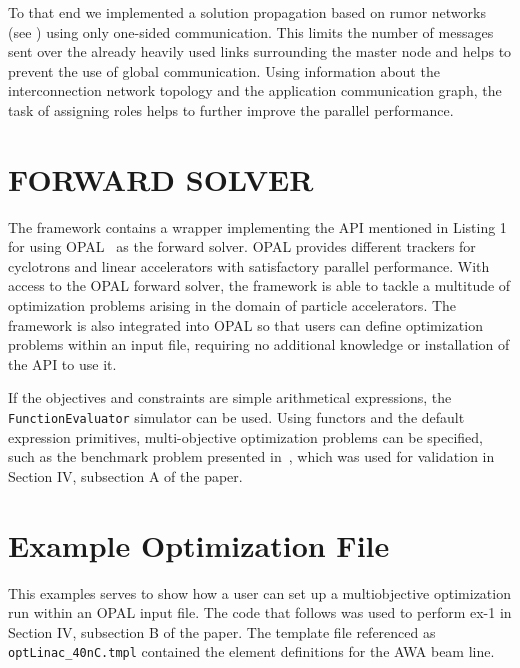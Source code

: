\documentclass[preprint,linenumbers,amsmath,amssymb,aps,prstab]{revtex4-1}%
\begin{document}
To that end we implemented a solution propagation based on rumor networks 
(see \cite{bgps:06,ayss:09}) using only one-sided communication.
This limits the number of messages sent over the already heavily used links
surrounding the master node and helps to prevent the use of
global communication. Using information about the interconnection network topology and the
application communication graph, the task of assigning roles helps to further
improve the parallel performance.



\section{FORWARD SOLVER} \label{sec:forward-solver}

The framework contains a wrapper implementing the API mentioned in
  Listing 1 for using \textsc{OPAL}~\cite{opal} as the forward solver.
\textsc{OPAL} provides different trackers for cyclotrons and linear
  accelerators with satisfactory parallel performance. 
With access to the \textsc{OPAL} forward solver, the framework is able to
  tackle a multitude of optimization problems arising in the domain of
  particle accelerators.
  The framework is also integrated into \textsc{OPAL} so that users can 
  define optimization problems within an input file, requiring no 
  additional knowledge or installation of the API to use it.

If the objectives and constraints are simple arithmetical expressions, 
the \texttt{FunctionEvaluator} simulator can be used.
Using functors and the default expression primitives, 
multi-objective optimization problems can be specified, 
such as the benchmark problem presented in~\cite{hbwh:05}, 
which was used for validation in Section IV, subsection A of the paper.



\section{Example Optimization File}

This examples serves to show how a user can 
set up a multiobjective optimization run 
within an OPAL input file. 
The code that follows was used to perform ex-1 in 
Section IV, subsection B of the paper. 
The template file referenced as \verb|optLinac_40nC.tmpl| contained the 
element definitions for the AWA beam line. 
\end{document}
